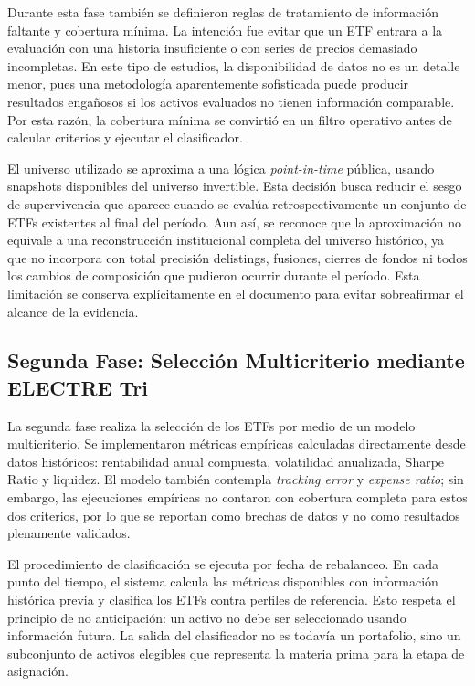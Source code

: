 \documentclass[12pt,letterpaper]{article}
\begin{document}
Durante esta fase también se definieron reglas de tratamiento de información faltante y cobertura mínima. La intención fue evitar que un ETF entrara a la evaluación con una historia insuficiente o con series de precios demasiado incompletas. En este tipo de estudios, la disponibilidad de datos no es un detalle menor, pues una metodología aparentemente sofisticada puede producir resultados engañosos si los activos evaluados no tienen información comparable. Por esta razón, la cobertura mínima se convirtió en un filtro operativo antes de calcular criterios y ejecutar el clasificador.

El universo utilizado se aproxima a una lógica \textit{point-in-time} pública, usando snapshots disponibles del universo invertible. Esta decisión busca reducir el sesgo de supervivencia que aparece cuando se evalúa retrospectivamente un conjunto de ETFs existentes al final del período. Aun así, se reconoce que la aproximación no equivale a una reconstrucción institucional completa del universo histórico, ya que no incorpora con total precisión delistings, fusiones, cierres de fondos ni todos los cambios de composición que pudieron ocurrir durante el período. Esta limitación se conserva explícitamente en el documento para evitar sobreafirmar el alcance de la evidencia.


\subsection{Segunda Fase: Selección Multicriterio mediante ELECTRE Tri}

La segunda fase realiza la selección de los ETFs por medio de un modelo multicriterio. Se implementaron métricas empíricas calculadas directamente desde datos históricos: rentabilidad anual compuesta, volatilidad anualizada, Sharpe Ratio y liquidez. El modelo también contempla \textit{tracking error} y \textit{expense ratio}; sin embargo, las ejecuciones empíricas no contaron con cobertura completa para estos dos criterios, por lo que se reportan como brechas de datos y no como resultados plenamente validados.

El procedimiento de clasificación se ejecuta por fecha de rebalanceo. En cada punto del tiempo, el sistema calcula las métricas disponibles con información histórica previa y clasifica los ETFs contra perfiles de referencia. Esto respeta el principio de no anticipación: un activo no debe ser seleccionado usando información futura. La salida del clasificador no es todavía un portafolio, sino un subconjunto de activos elegibles que representa la materia prima para la etapa de asignación.
\end{document}
